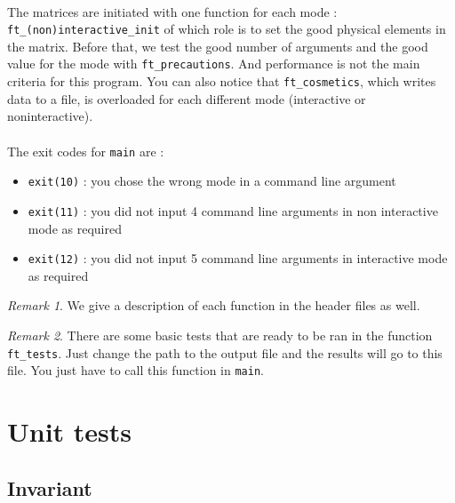 \documentclass[a4paper, twoside, 11pt]{report}
\theoremstyle{theorem}
\theoremstyle{remark}
\newtheorem{remark}{Remark}[chapter]
\theoremstyle{exemple}
\begin{document}
			\paragraph{}The matrices are initiated with one function for each mode : \texttt{ft\_(non)interactive\_init} of which role is to set the good physical elements in the matrix. Before that, we test the good number of arguments and the good value for the mode with \texttt{ft\_precautions}. And performance is not the main criteria for this program. You can also notice that \texttt{ft\_cosmetics}, which writes data to a file, is overloaded for each different mode (interactive or noninteractive).
			
			\paragraph{}The exit codes for \texttt{main} are : 
				\begin{itemize}
				\setlength\itemsep{0em}
					\item{\texttt{exit(10)} : you chose the wrong mode in a command line argument}
					\item{\texttt{exit(11)} : you did not input 4 command line arguments in non interactive mode as required}
					\item{\texttt{exit(12)} : you did not input 5 command line arguments in interactive mode as required}
				\end{itemize}
		
			\begin{remark}
				We give a description of each function in the header files as well.
			\end{remark}
			
			\begin{remark}
				There are some basic tests that are ready to be ran in the function \texttt{ft\_tests}. Just change the path to the output file and the results will go to this file. You just have to call this function in \texttt{main}.
			\end{remark}
			
   
    \section{Unit tests}
    
    	\subsection{Invariant}
	
\end{document}
